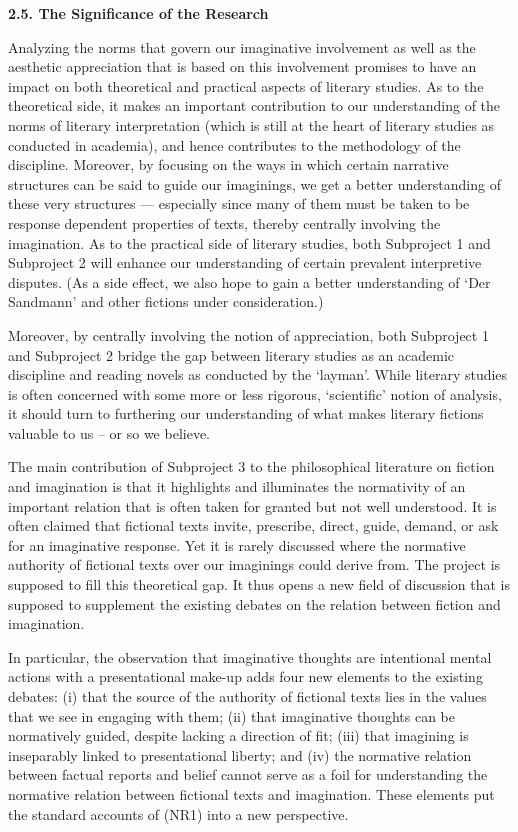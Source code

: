 \vspace{.2cm}
\noindent \textbf{2.5.  The Significance of the Research}
\vspace{.2cm}

\noindent Analyzing the norms that govern our imaginative involvement as well as the aesthetic appreciation that is based on this involvement promises to have an impact on both theoretical and practical aspects of literary studies. As to the theoretical side, it makes an important contribution to our understanding of the norms of literary interpretation (which is still at the heart of literary studies as conducted in academia), and hence contributes to the methodology of the discipline. Moreover, by focusing on the ways in which certain narrative structures can be said to guide our imaginings, we get a better understanding of these very structures --- especially since many of them must be taken to be response dependent properties of texts, thereby centrally involving the imagination. As to the practical side of literary studies, both Subproject 1 and Subproject 2 will enhance our understanding of certain prevalent interpretive disputes. (As a side effect, we also hope to gain a better understanding of `Der Sandmann' and other fictions under consideration.)
 
Moreover, by centrally involving the notion of appreciation, both Subproject 1 and Subproject 2 bridge the gap between literary studies as an academic discipline and reading novels as conducted by the `layman'. While literary studies is often concerned with some more or less rigorous, `scientific' notion of analysis, it should turn to furthering our understanding of what makes literary fictions valuable to us -- or so we believe. 

The main contribution of Subproject 3 to the philosophical literature on fiction and imagination is that it highlights and illuminates the normativity of an important relation that is often taken for granted but not well understood. It is often claimed that fictional texts invite, prescribe, direct, guide, demand, or ask for an imaginative response. Yet it is rarely discussed where the normative authority of fictional texts over our imaginings could derive from. The project is supposed to fill this theoretical gap. It thus opens a new field of discussion that is supposed to supplement the existing debates on the relation between fiction and imagination. 

In particular, the observation that imaginative thoughts are intentional mental actions with a presentational make-up adds four new elements to the existing debates: (i) that the source of the authority of fictional texts lies in the values that we see in engaging with them; (ii) that imaginative thoughts can be normatively guided, despite lacking a direction of fit; (iii) that imagining is inseparably linked to presentational liberty; and (iv) the normative relation between factual reports and belief cannot serve as a foil for understanding the normative relation between fictional texts and imagination. These elements put the standard accounts of (NR1) into a new perspective. 



